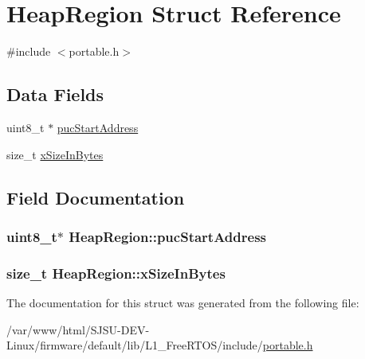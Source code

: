 \hypertarget{structHeapRegion}{}\section{Heap\+Region Struct Reference}
\label{structHeapRegion}


{\ttfamily \#include $<$portable.\+h$>$}

\subsection*{Data Fields}
\begin{DoxyCompactItemize}
\item 
uint8\+\_\+t $\ast$ \hyperlink{structHeapRegion_aab323508c34642ebfb884a68441d97fc}{puc\+Start\+Address}
\item 
size\+\_\+t \hyperlink{structHeapRegion_a5933b0fd422e70a92ceef839b89a757f}{x\+Size\+In\+Bytes}
\end{DoxyCompactItemize}


\subsection{Field Documentation}
\subsubsection[{\texorpdfstring{puc\+Start\+Address}{pucStartAddress}}]{\setlength{\rightskip}{0pt plus 5cm}uint8\+\_\+t$\ast$ Heap\+Region\+::puc\+Start\+Address}\hypertarget{structHeapRegion_aab323508c34642ebfb884a68441d97fc}{}\label{structHeapRegion_aab323508c34642ebfb884a68441d97fc}
\subsubsection[{\texorpdfstring{x\+Size\+In\+Bytes}{xSizeInBytes}}]{\setlength{\rightskip}{0pt plus 5cm}size\+\_\+t Heap\+Region\+::x\+Size\+In\+Bytes}\hypertarget{structHeapRegion_a5933b0fd422e70a92ceef839b89a757f}{}\label{structHeapRegion_a5933b0fd422e70a92ceef839b89a757f}


The documentation for this struct was generated from the following file\+:\begin{DoxyCompactItemize}
\item 
/var/www/html/\+S\+J\+S\+U-\/\+D\+E\+V-\/\+Linux/firmware/default/lib/\+L1\+\_\+\+Free\+R\+T\+O\+S/include/\hyperlink{portable_8h}{portable.\+h}\end{DoxyCompactItemize}
